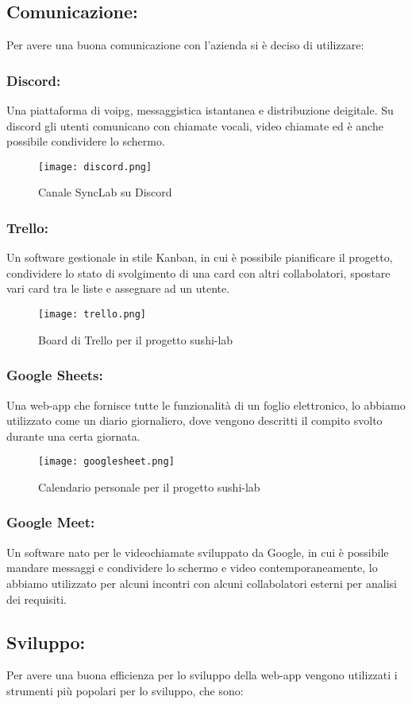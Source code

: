 \subsection{Comunicazione:}
Per avere una buona comunicazione con l'azienda si è deciso di utilizzare:
\subsubsection{Discord:}
Una piattaforma di \gls{voipg}, messaggistica istantanea e distribuzione deigitale. Su discord gli utenti comunicano con chiamate vocali, video chiamate ed è anche possibile condividere lo schermo.
\begin{figure}[H]
    \centering
    \texttt{[image: discord.png]}
    \caption{Canale SyncLab su Discord}
\end{figure}
\subsubsection{Trello:}
Un software gestionale in stile Kanban, in cui è possibile pianificare il progetto, condividere lo stato di svolgimento di una card con altri collabolatori, spostare vari card tra le liste e assegnare ad un utente.
\begin{figure}[H]
    \centering
    \texttt{[image: trello.png]}
    \caption{Board di Trello per il progetto sushi-lab}
\end{figure}
\subsubsection{Google Sheets:}
Una web-app che fornisce tutte le funzionalità di un foglio elettronico, lo abbiamo utilizzato come un diario giornaliero, dove vengono descritti il compito svolto durante una certa giornata.
\begin{figure}[H]
    \centering
    \texttt{[image: googlesheet.png]}
    \caption{Calendario personale per il progetto sushi-lab}
\end{figure}
\subsubsection{Google Meet:}
Un software nato per le videochiamate sviluppato da Google, in cui è possibile mandare messaggi e condividere lo schermo e video contemporaneamente, lo abbiamo utilizzato per alcuni incontri con alcuni collabolatori esterni per analisi dei requisiti.
\subsection{Sviluppo:}
Per avere una buona efficienza per lo sviluppo della web-app vengono utilizzati i strumenti più popolari per lo sviluppo, che sono:
